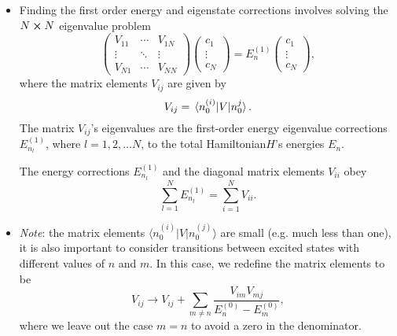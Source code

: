 \documentclass[11pt, a4paper]{article}
\newcommand{\Ham}{Hamiltonian\xspace}
\newcommand{\bmel}[3]{\big \langle {#1} \big | {#2} \big | {#3} \big \rangle}  %
\begin{document}
\begin{itemize}
    \item Finding the first order energy and eigenstate corrections involves solving the $ N \cross N $ eigenvalue problem
    \begin{equation*}
        \begin{pmatrix}
            V_{11} & \cdots & V_{1N}\\
            \vdots & \ddots & \vdots\\
            V_{N1} & \cdots & V_{NN}
        \end{pmatrix}
        \begin{pmatrix}
            c_{1}\\
            \vdots\\
            c_{N}
        \end{pmatrix}
        = E_{n}^{(1)}
        \begin{pmatrix}
            c_{1}\\
            \vdots\\
            c_{N}
        \end{pmatrix},
    \end{equation*}
    where the matrix elements $ V_{ij} $ are given by
    \begin{equation*}
        V_{ij} = \mel*{n_{0}^{(i)}}{V}{n_{0}^{j}}.
    \end{equation*}
    The matrix $ V_{ij} $'s eigenvalues are the first-order energy eigenvalue corrections $ E_{n_{l}}^{(1)} $, where $ l = 1, 2, \ldots N $, to the total \Ham $ H $'s energies $ E_{n} $.

    The energy corrections $ E_{n_{l}}^{(1)} $ and the diagonal matrix elements $ V_{ii} $ obey
    \begin{equation*}
        \sum_{l = 1}^{N} E_{n_{l}}^{(1)} = \sum_{i = 1}^{N}V_{ii}.
    \end{equation*}
    
    \item \textit{Note}: the matrix elements $ \bmel{n_{0}^{(i)}}{V}{n_{0}^{(j)}} $ are small (e.g. much less than one), it is also important to consider transitions between excited states with different values of $ n $ and $ m $. In this case, we redefine the matrix elements to be
    \begin{equation*}
        V_{ij} \to V_{ij} + \sum_{m\neq n} \frac{V_{im}V_{mj}}{E_{n}^{(0)} - E_{m}^{(0)}},
    \end{equation*}
    where we leave out the case $ m = n $ to avoid a zero in the denominator.
\end{itemize}
\end{document}
